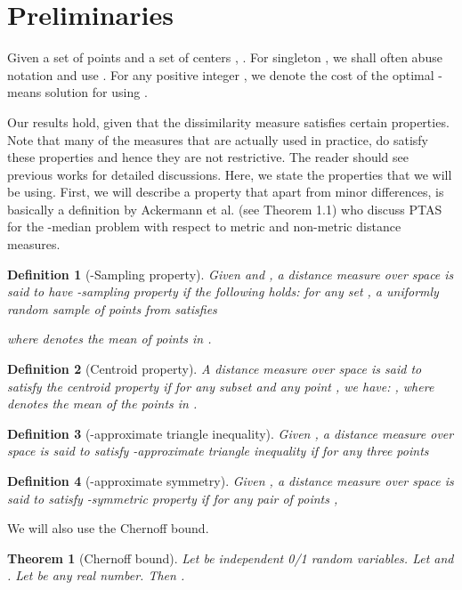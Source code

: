 \documentclass[11pt]{article}
\newtheorem{theorem}{Theorem}
\newtheorem{definition}{Definition}
\begin{document}
\section{Preliminaries}
\label{sec:pre}

Given a set of points  and a set of centers , .
For singleton , we shall often abuse notation and use .
For any positive integer , we denote the cost of the optimal -means solution for  using .  

Our results hold, given that the dissimilarity measure satisfies certain properties. 
Note that many of the measures that are actually used in practice, do satisfy these properties and hence they are not restrictive. 
The reader should see previous works \cite{jks12, abs10} for detailed discussions.
Here, we state the properties that we will be using.
First, we will describe a property that apart from minor differences, is basically a definition by Ackermann et al. \cite{abs10} (see Theorem 1.1) who discuss PTAS 
for the -median problem with respect to metric and non-metric distance measures.

\begin{definition}[-Sampling property]
Given  and , a distance measure  over space  is said to have -sampling property if the following holds:
for any set , a uniformly random sample  of  points from  satisfies 

where  denotes the mean of points in .
\end{definition}

\begin{definition}[Centroid property]
A distance measure  over space  is said to satisfy the centroid property if for any subset  and any point , we have: ,
where  denotes the mean of the points in .
\end{definition}

\begin{definition}[-approximate triangle inequality]
Given , a distance measure  over space  is said to satisfy -approximate triangle inequality if for any three points 
\end{definition}

\begin{definition}[-approximate symmetry]
Given , a distance measure  over space  is said to satisfy -symmetric property if for any pair of points , 
\end{definition}

\noindent
We will also use the Chernoff bound.
\begin{theorem}[Chernoff bound]\label{thm:chernoff}
Let  be independent 0/1 random variables. Let  and . 
Let  be any real number. Then  .
\end{theorem}
\end{document}
